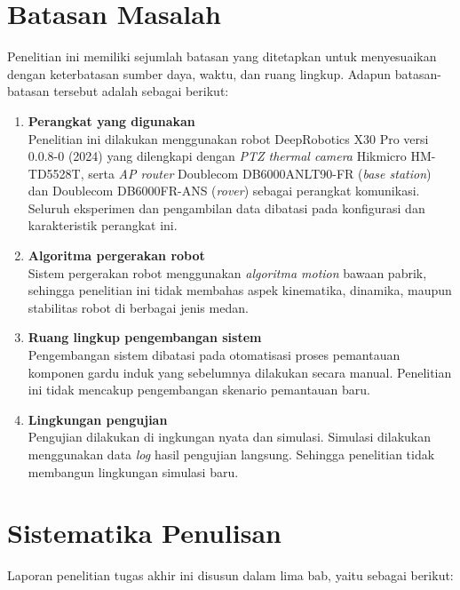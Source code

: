     
  \newpage  
\section{Batasan Masalah}
Penelitian ini memiliki sejumlah batasan yang ditetapkan untuk menyesuaikan dengan keterbatasan sumber daya, waktu, dan ruang lingkup. Adapun batasan-batasan tersebut adalah sebagai berikut:

\begin{enumerate}
    \item\textbf{Perangkat yang digunakan} \\
    Penelitian ini dilakukan menggunakan robot DeepRobotics X30 Pro versi 0.0.8-0 (2024) yang dilengkapi dengan \emph{ PTZ thermal camera} Hikmicro HM-TD5528T, serta \emph{AP router} Doublecom DB6000ANLT90-FR (\emph{base station}) dan Doublecom DB6000FR-ANS (\emph{rover}) sebagai perangkat komunikasi. Seluruh eksperimen dan pengambilan data dibatasi pada konfigurasi dan karakteristik perangkat ini.
    
    \item \textbf{Algoritma pergerakan robot} \\
    Sistem pergerakan robot menggunakan \emph{algoritma motion} bawaan pabrik, sehingga penelitian ini tidak membahas aspek kinematika, dinamika, maupun stabilitas robot di berbagai jenis medan.

    \item \textbf{Ruang lingkup pengembangan sistem} \\
    Pengembangan sistem dibatasi pada otomatisasi proses pemantauan komponen gardu induk yang sebelumnya dilakukan secara manual. Penelitian ini tidak mencakup pengembangan skenario pemantauan baru.

    \item \textbf{Lingkungan pengujian} \\
    Pengujian dilakukan di ingkungan nyata dan simulasi. Simulasi dilakukan menggunakan data \emph{log} hasil pengujian langsung. Sehingga penelitian tidak membangun lingkungan simulasi baru.
\end{enumerate}




\section{Sistematika Penulisan}
\label{sec:sistematikapenulisan}

Laporan penelitian tugas akhir ini disusun dalam lima bab, yaitu sebagai berikut:

